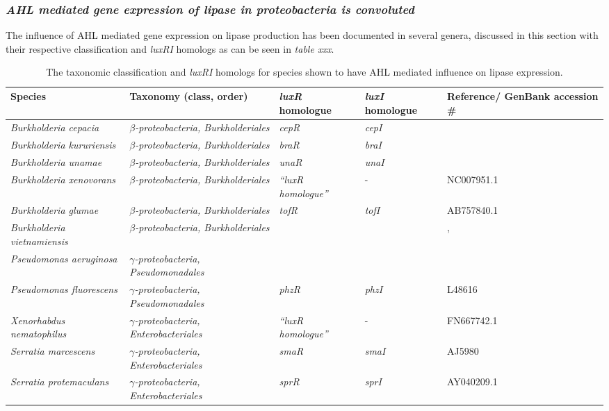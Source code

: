 \documentclass[11pt]{article}
\begin{document}
\subsubsection{\emph{AHL mediated gene expression of lipase in proteobacteria is convoluted}}
The influence of AHL mediated gene expression on lipase production has been documented in several genera, discussed in this section with their respective classification and \emph{luxRI} homologs as can be seen in \emph{table xxx}.

\begin{table}
\begin{tabular}{ | p{2.5cm} | p{3cm} | p{1.5cm} | p{1.5cm} | p{2.5cm} | }
\hline
Species & Taxonomy (class, order) & \emph{luxR} homologue & \emph{luxI} homologue & Reference/ GenBank accession \# \\
\hline
\emph{Burkholderia cepacia} & \emph{$\beta$-proteobacteria, Burkholderiales} & \emph{cepR} & \emph{cepI} & \cite{lewenza1999} \\
\hline
\emph{Burkholderia kururiensis} & \emph{$\beta$-proteobacteria, Burkholderiales} & \emph{braR} & \emph{braI} & \cite{suarez2008} \\
\hline
\emph{Burkholderia unamae} & \emph{$\beta$-proteobacteria, Burkholderiales} & \emph{unaR} & \emph{unaI} & \cite{suarez2010} \\
\hline
\emph{Burkholderia xenovorans} & \emph{$\beta$-proteobacteria, Burkholderiales} & \emph{“luxR homologue”} & - & NC007951.1 \\
\hline
\emph{Burkholderia glumae} & \emph{$\beta$-proteobacteria, Burkholderiales} & \emph{tofR} & \emph{tofI} & AB757840.1 \\
\hline
\emph{Burkholderia vietnamiensis} & \emph{$\beta$-proteobacteria, Burkholderiales} & \emph{} & \emph{} & \cite{conway_02}, \cite{ulrich2004}
 \\
\hline
\emph{Pseudomonas aeruginosa} & \emph{$\gamma$-proteobacteria, Pseudomonadales} & \emph{} & \emph{} & \cite{juhas2005} \\
\hline
\emph{Pseudomonas fluorescens} & \emph{$\gamma$-proteobacteria, Pseudomonadales} & \emph{phzR} & \emph{phzI} & L48616 \\
\hline
\emph{Xenorhabdus nematophilus} & \emph{$\gamma$-proteobacteria, Enterobacteriales} & \emph{“luxR homologue”} & - & FN667742.1 \\
\hline
\emph{Serratia marcescens} & \emph{$\gamma$-proteobacteria, Enterobacteriales} & \emph{smaR} & \emph{smaI} & AJ5980 \\
\hline
\emph{Serratia protemaculans} & \emph{$\gamma$-proteobacteria, Enterobacteriales} & \emph{sprR} & \emph{sprI} & AY040209.1 \\
\hline
\end{tabular}
\caption{The taxonomic classification and \emph{luxRI} homologs for species shown to have AHL mediated influence on lipase expression.}
\end{table}
\end{document}
